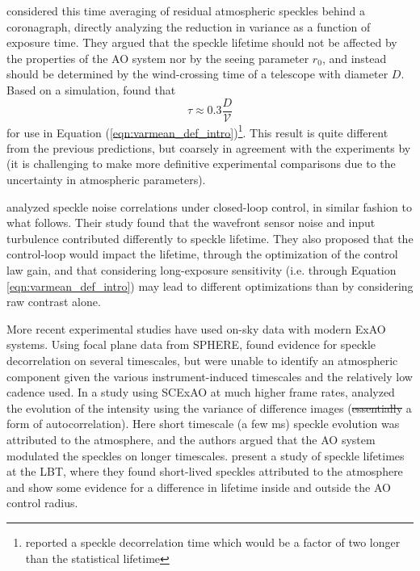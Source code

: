 \documentclass[10pt,preprint]{aastex631}
\newcommand{\mpfrmv}[1]{\textcolor{avocado}{\sout{#1}}}
\begin{document}
\citet{2005SPIE.5903..170M} considered this time averaging of residual atmospheric speckles behind a coronagraph, directly analyzing the reduction in variance as a function of exposure time.  They argued that the speckle lifetime should not be affected by the properties of the AO system nor by the seeing parameter $r_0$, and instead should be determined by the wind-crossing time of a telescope with diameter $D$.  Based on a simulation, \citet{2005SPIE.5903..170M} found that 
\begin{equation}
\tau \approx 0.3 \frac{D}{\mathcal{V}}
\end{equation}
for use in Equation (\ref{eqn:varmean_def_intro})\footnote{\citet{2005SPIE.5903..170M} reported a speckle decorrelation time which would be a factor of two longer than the statistical lifetime}.  This result is quite different from the previous predictions, but coarsely in agreement with the experiments by \citet{2006ApJ...637..541F} (it is challenging to make more definitive experimental comparisons due to the uncertainty in atmospheric parameters).

\citet{2006OExpr..14.7499P} analyzed speckle noise correlations under closed-loop control, in similar fashion to what follows.  Their study found that the wavefront sensor noise and input turbulence contributed differently to speckle lifetime.  They also proposed that the control-loop would impact the lifetime, through the optimization of the control law gain, and that considering long-exposure sensitivity (i.e. through Equation \ref{eqn:varmean_def_intro}) may lead to different optimizations than by considering raw contrast alone. 

More recent experimental studies have used on-sky data with modern ExAO systems.  Using focal plane data from SPHERE, \citet{2016SPIE.9909E..4ZM} found evidence for speckle decorrelation on several timescales, but were unable to identify an atmospheric component given the various instrument-induced timescales and the relatively low cadence used. In a study using SCExAO at much higher frame rates, \citet{2018PASP..130j4502G} analyzed the evolution of the intensity using the variance of difference images (\mpfrmv{essentially }a form of autocorrelation).  Here short timescale (a few ms) speckle evolution was attributed to the atmosphere, and the authors argued that the AO system modulated the speckles on longer timescales.  \citet{2017JATIS...3b5001S} present a study of speckle lifetimes at the LBT, where they found short-lived speckles attributed to the atmosphere and show some evidence for a difference in lifetime inside and outside the AO control radius.
\end{document}
